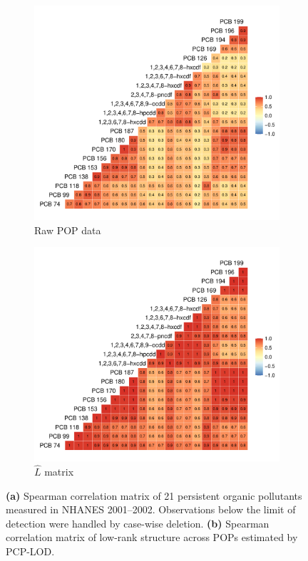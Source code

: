 \begin{landscape}
\begin{figure}
\centering
\begin{subfigure}[b]{0.655\textwidth}
\includegraphics[width=1\linewidth]{./figures/nhanes_raw_corr.pdf}
\caption{Raw POP data}
\label{fig:nhanes_corr}
\end{subfigure}
\hspace{-1em}
\begin{subfigure}[b]{0.655\textwidth}
\includegraphics[width=1\linewidth]{./figures/nhanes_L_corr.pdf}
\caption{$\hat{L}$ matrix}
\label{fig:nhanes_corr_l}
\end{subfigure}
\caption[Correlation of 21 POPs in NHANES 2001--2002]{\textbf{(a)} Spearman correlation matrix of 21 persistent organic pollutants measured in NHANES 2001--2002. Observations below the limit of detection were handled by case-wise deletion. \textbf{(b)} Spearman correlation matrix of low-rank structure across POPs estimated by PCP-LOD.}
\end{figure}
\end{landscape}

